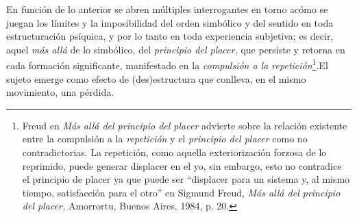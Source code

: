 En función de lo anterior se abren múltiples interrogantes en torno acómo se juegan los límites y la imposibilidad del orden simbólico y del sentido en toda estructuración psíquica, y por lo tanto en toda experiencia subjetiva; es decir, aquel \emph{más allá} de lo simbólico, del \emph{principio del placer,} que persiste y retorna en cada formación significante, manifestado en la \emph{compulsión a la repetición}\footnote{Freud en \emph{Más allá del principio del placer} advierte sobre la relación existente entre la compulsión a la \emph{repetición} y el \emph{principio del placer} como no contradictorias. La repetición, como aquella exteriorización forzosa de lo reprimido, puede generar displacer en el yo, sin embargo, esto no contradice el principio de placer ya que puede ser \enquote{displacer para un sistema y, al mismo tiempo, satisfacción para el otro} en Sigmund Freud, \emph{Más allá del principio del placer,} Amorrortu, Buenos Aires, 1984, p. 20.}.El sujeto emerge como efecto de (des)estructura que conlleva, en el mismo movimiento, una pérdida.

